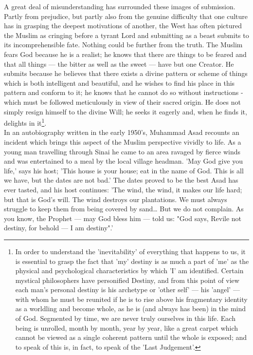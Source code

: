 \documentclass[11pt, b5paper, twoside]{book}
\begin{document}
A great deal of misunderstanding has surrounded these images of submission. Partly from prejudice, 
but partly also from the genuine difficulty that one culture has in grasping the deepest motivations 
of another, the West has often pictured the Muslim as cringing before a tyrant Lord and submitting as 
a beast submits to its incomprehensible fate. Nothing could be further from the truth. The Muslim 
fears God because he is a realist; he knows that there are things to be feared and that all things --- 
the bitter as well as the sweet --- have but one Creator. He submits because he believes that there 
exists a divine pattern or scheme of things which is both intelligent and beautiful, and he wishes to 
find his place in this pattern and conform to it; he knows that he cannot do so without instructions 
- which must be followed meticulously in view of their sacred origin. He does not simply resign 
himself to the divine Will; he seeks it eagerly and, when he finds it, delights in it\footnote{In order to understand the 'inevitability' of everything that happens to us, it is essential to grasp the fact that 'my' destiny is as much a part of 'me' as the physical and psychological characteristics by which 'I' am identified. Certain mystical philosophers have personified Destiny, and from this point of view each man's personal destiny is his archetype or 'other self' --- his 'angel' --- with whom he must be reunited if he is to rise above his fragmentary identity as a worldling and become whole, as he is (and always has been) in the mind of God. Segmented by time, we are never truly ourselves in this life. Each being is unrolled, month by month, year by year, like a great carpet which cannot be viewed as a single coherent pattern until the whole is exposed; and to speak of this is, in fact, to speak of the 'Last Judgement'.}. \\


In an autobiography written in the early 1950's, Muhammad Asad recounts an incident which brings this 
aspect of the Muslim perspective vividly to life. As a young man travelling through Sinai he came to 
an area ravaged by fierce winds and was entertained to a meal by the local village headman. 'May God 
give you life,' says his host; 'This house is your house; eat in the name of God. This is all we 
have, but the dates are not bad.' The dates proved to be the best Asad has ever tasted, and his host 
continues: 'The wind, the wind, it makes our life hard; but that is God's will. The wind destroys our 
plantations. We must always struggle to keep them from being covered by sand\ldots{} But we do not 
complain. As you know, the Prophet --- may God bless him --- told us: "God says, Revile not destiny, for 
behold --- I am destiny".' \\
\end{document}
